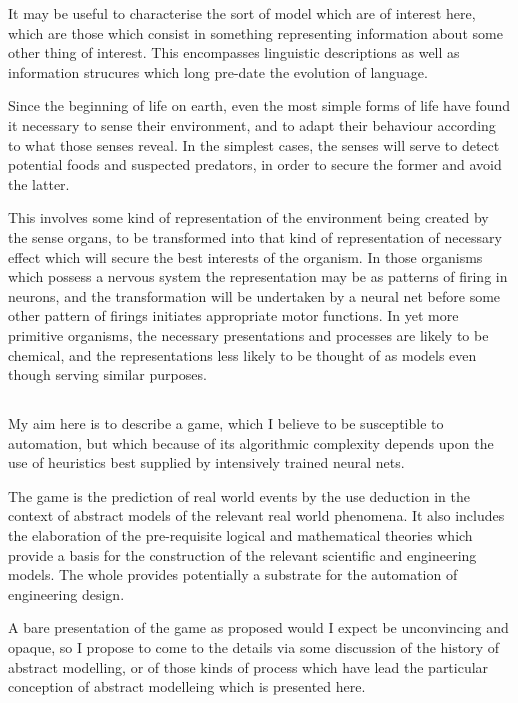 \documentclass[10pt,titlepage]{book}
\begin{document}
It may be useful to characterise the sort of model which are of interest here, which are those which consist in something representing information about some other thing of interest.
This encompasses linguistic descriptions as well as information strucures which long pre-date the evolution of language.

Since the beginning of life on earth, even the most simple forms of life have found it necessary to sense their environment, and to adapt their behaviour according to what those senses reveal.
In the simplest cases, the senses will serve to detect potential foods and suspected predators, in order to secure the former and avoid the latter.

This involves some kind of representation of the environment being created by the sense organs, to be transformed into that kind of representation of necessary effect which will secure the best interests of the organism.
In those organisms which possess a nervous system the representation may be as patterns of firing in neurons, and the transformation will be undertaken by a neural net before some other pattern of firings initiates appropriate motor functions.
In yet more primitive organisms, the necessary presentations and processes are likely to be chemical, and the representations less likely to be thought of as models even though serving similar purposes.

\subsection{}

My aim here is to describe a game, which I believe to be susceptible to automation, but which because of its algorithmic complexity depends upon the use of heuristics best supplied by intensively trained neural nets.

The game is the prediction of real world events by the use deduction in the context of abstract models of the relevant real world phenomena.
It also includes the elaboration of the pre-requisite logical and mathematical theories which provide a basis for the construction of the relevant scientific and engineering models.
The whole provides potentially a substrate for the automation of engineering design.

A bare presentation of the game as proposed would I expect be unconvincing and opaque, so I propose to come to the details via some discussion of the history of abstract modelling, or of those kinds of process which have lead the particular conception of abstract modelleing which is presented here.
\end{document}
